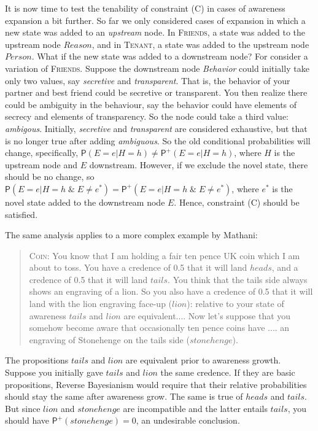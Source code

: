 \documentclass[
  11pt,
  dvipsnames,enabledeprecatedfontcommands]{scrartcl}
\newcommand{\pr}[1]{\ensuremath{\mathsf{P}(#1)}}
\newcommand{\ppr}[2]{\ensuremath{\mathsf{P}^{#1}(#2)}}
\begin{document}
It is now time to test the tenability of constraint (C) in cases of
awareness expansion a bit further. So far we only considered cases of
expansion in which a new state was added to an \emph{upstream} node. In
\textsc{Friends}, a state was added to the upstream node \(Reason\), and
in \textsc{Tenant}, a state was added to the upstream node \(Person\).
What if the new state was added to a downstream node? For consider a
variation of \textsc{Friends}. Suppose the downstream node
\textit{Behavior} could initially take only two values, say
\textit{secretive} and \textit{transparent}. That is, the behavior of
your partner and best friend could be secretive or transparent. You then
realize there could be ambiguity in the behaviour, say the behavior
could have elements of secrecy and elements of transparency. So the node
could take a third value: \textit{ambigous}. Initially,
\textit{secretive} and \textit{transparent} are considered exhaustive,
but that is no longer true after adding \textit{ambiguous}. So the old
conditional probabilities will change, specifically,
\(\pr{E=e \vert H=h}\neq \ppr{+}{E=e \vert H=h}\), where \(H\) is the
upstream node and \(E\) downstream. However, if we exclude the novel
state, there should be no change, so
\(\pr{E=e \vert H=h \; \& \; E\neq e^* } = \ppr{+}{E=e \vert H=h \; \& \; E\neq e^*}\),
where \(e^*\) is the novel state added to the downstream node \(E\).
Hence, constraint (C) should be satisfied.

The same analysis applies to a more complex example by Mathani:

\begin{quote} 
\textsc{Coin}: You know that I am holding a fair ten pence UK coin which I am about to toss. You
have a credence of 0.5 that it will land $heads$, and a credence of 0.5 that it will
land $tails$. You think that the tails side always shows an engraving of a lion. So you
also  have a credence of 0.5 that it will land with the lion engraving face-up ($lion$): relative to your state of awareness $tails$ and $lion$ are equivalent.... Now let's suppose that you somehow become aware that occasionally ten pence coins have .... an engraving of Stonehenge on the tails side ($stonehenge$). 
\end{quote}

\doublespace

\noindent  The propositions \(tails\) and \(lion\) are equivalent prior
to awareness growth. Suppose you initially gave \(tails\) and \(lion\)
the same credence. If they are basic propositions, Reverse Bayesianism
would require that their relative probabilities should stay the same
after awareness grow. The same is true of \(heads\) and \(tails\). But
since \(lion\) and \(stonehenge\) are incompatible and the latter
entails \(tails\), you should have \(\ppr{+}{stonehenge} = 0\), an
undesirable conclusion.
\end{document}
